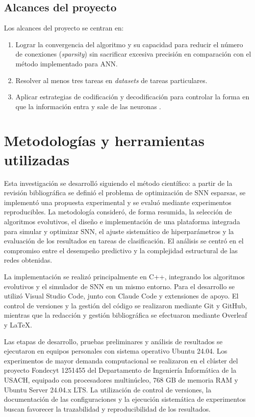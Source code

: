 \subsection{Alcances del proyecto}
Los alcances del proyecto se centran en: 
\begin{enumerate}
    \item Lograr la convergencia del algoritmo y su capacidad para reducir el número de conexiones (\textit{sparsity}) sin sacrificar excesiva precisión en comparación con el método implementado para ANN.
    \item Resolver al menos tres tareas en \textit{datasets} de tareas particulares.
    \item Aplicar estrategias de codificación y decodificación para controlar la forma en que la información entra y sale de las neuronas \cite{Luu2025HybridLA}.
\end{enumerate}

\section{Metodologías y herramientas utilizadas}

Esta investigación se desarrolló siguiendo el método científico: a partir de la revisión bibliográfica se definió el problema de optimización de SNN esparsas, se implementó una propuesta experimental y se evaluó mediante experimentos reproducibles. La metodología consideró, de forma resumida, la selección de algoritmos evolutivos, el diseño e implementación de una plataforma integrada para simular y optimizar SNN, el ajuste sistemático de hiperparámetros y la evaluación de los resultados en tareas de clasificación. El análisis se centró en el compromiso entre el desempeño predictivo y la complejidad estructural de las redes obtenidas.

La implementación se realizó principalmente en C++, integrando los algoritmos evolutivos y el simulador de SNN en un mismo entorno. Para el desarrollo se utilizó Visual Studio Code, junto con Claude Code y extensiones de apoyo. El control de versiones y la gestión del código se realizaron mediante Git y GitHub, mientras que la redacción y gestión bibliográfica se efectuaron mediante Overleaf y \LaTeX{}.

Las etapas de desarrollo, pruebas preliminares y análisis de resultados se ejecutaron en equipos personales con sistema operativo Ubuntu 24.04. Los experimentos de mayor demanda computacional se realizaron en el clúster del proyecto Fondecyt 1251455 del Departamento de Ingeniería Informática de la USACH, equipado con procesadores multinúcleo, 768 GB de memoria RAM y Ubuntu Server 24.04.x LTS. La utilización de control de versiones, la documentación de las configuraciones y la ejecución sistemática de experimentos buscan favorecer la trazabilidad y reproducibilidad de los resultados.

